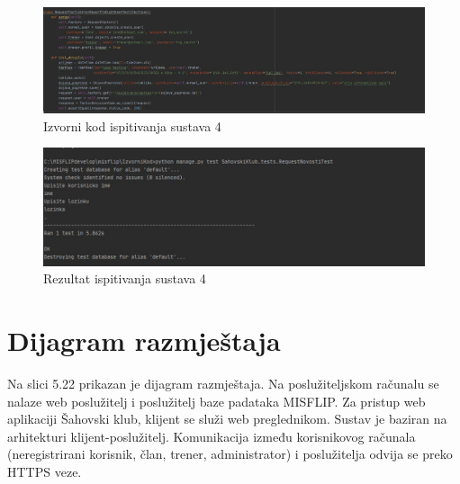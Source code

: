 			 \begin{figure}[H]
			 	\centerfloat
			 	\includegraphics[scale=0.40]{slike/ispitivanjesustava4izv.jpeg} %
			 	\caption{Izvorni kod ispitivanja sustava 4}
			 	
			 \end{figure}
			 
			 \begin{figure}[H]
			 	\centerfloat
			 	\includegraphics[scale=0.55]{slike/ispitivanjesustava3.jpeg} %
			 	\caption{Rezultat ispitivanja sustava 4}
			 	
			 \end{figure}
			
			\eject 
		
		
		\section{Dijagram razmještaja}
			
			
			Na slici 5.22 prikazan je dijagram razmještaja. Na poslužiteljskom računalu se nalaze web poslužitelj i poslužitelj baze padataka MISFLIP. Za pristup web aplikaciji Šahovski klub, klijent se služi web preglednikom. Sustav je baziran na arhitekturi klijent-poslužitelj. Komunikacija između korisnikovog računala (neregistrirani korisnik, član, trener, administrator) i poslužitelja odvija se preko HTTPS veze.
			
